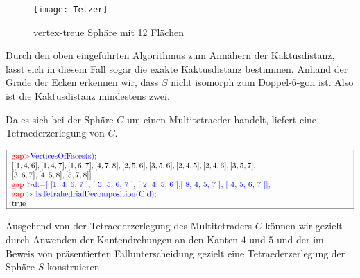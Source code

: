 \documentclass[12pt,titlepage,twoside,cleardoublepage]{article}
\theoremstyle{nummermitklammern}
\numberwithin{equation}{section}
\begin{document}
 \begin{figure}[H]
\begin{center}
\texttt{[image: Tetzer]}
\end{center}
\caption{vertex-treue Sphäre mit 12 Flächen}
\end{figure}
Durch den oben eingeführten Algorithmus zum Annähern der Kaktusdistanz, lässt sich in diesem Fall sogar die exakte Kaktusdistanz bestimmen. Anhand der Grade der Ecken erkennen wir, dass $S$ nicht isomorph zum Doppel-6-gon ist. Also ist die Kaktusdistanz mindestens zwei.
\begin{center}
 \end{center}
Da es sich bei der Sphäre $C$ um einen Multitetraeder handelt, liefert  eine Tetraederzerlegung von $C.$
\begin{center}
 $\fbox{
\parbox{15cm}{
\textcolor{red}{gap$>$}\textcolor{blue}{ VerticesOfFaces(s);}\newline 
$[ [ 1, 4, 6 ], [ 1, 4, 7 ], [ 1, 6, 7 ], [ 4, 7, 8 ], [ 2, 5, 6 ],
[ 3, 5, 6 ],[ 2, 4, 5 ], [ 2, 4, 6 ], [ 3, 5, 7 ],$ \newline
$  [ 3, 6, 7 ],
[ 4, 5, 8 ], [ 5, 7, 8 ] ]$\newline
\textcolor{red}{gap $>$}\textcolor{blue}{d:=[ [1, 4, 6, 7 ], [ 3, 5, 6, 7 ], [ 2, 4, 5, 6 ],[ 8, 4, 5, 7 ], [ 4, 5, 6, 7 ]];}\newline
\textcolor{red}{gap $>$} \textcolor{blue}{IsTetrahedrialDecomposition(C,d);}\newline
true
 }}$
 \end{center}
 Ausgehend von der Tetraederzerlegung des Multitetraders $C$ können wir gezielt durch Anwenden der Kantendrehungen an den Kanten $4$ und $5$ und der im Beweis von  präsentierten Fallunterscheidung gezielt eine Tetraederzerlegung der Sphäre $S$ konstruieren.
\end{document}

